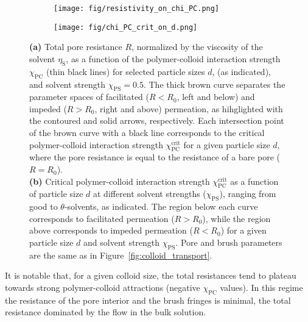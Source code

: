 \documentclass[12pt, a4paper]{article}
\begin{document}
\begin{figure}
    \centering
    \begin{subfigure}[b]{0.4\textwidth}
        \texttt{[image: fig/resistivity\_on\_chi\_PC.png]}
    \end{subfigure}
    \hspace{0.03\textwidth}
    \begin{subfigure}[b]{0.52\textwidth}
        \texttt{[image: fig/chi\_PC\_crit\_on\_d.png]}
    \end{subfigure}%
    \caption{
        \textbf{(a)} Total pore resistance $R$, normalized by the viscosity of the solvent $\eta_\text{S}$, as a function of the polymer-colloid interaction strength $\chi_{\text{PC}}$ (thin black lines) for selected particle sizes $d $, (as indicated), and solvent strength $\chi_{\text{PS}}=0.5$.
        The thick brown curve separates the parameter spaces of facilitated ($R < R_{0}$, left and below) and impeded ($R > R_{0}$, right and above) permeation, as hihglighted with the contoured and solid arrows, respectively.
        Each intersection point of the brown curve with a black line corresponds to the critical polymer-colloid interaction strength $\chi_{\text{PC}}^{\text{crit}}$ for a given particle size $d$, where the pore resistance is equal to the resistance of a bare pore ($R = R_{0}$).
        \\
        \textbf{(b)} Critical polymer-colloid interaction strength $\chi_{\text{PC}}^{\text{crit}}$ as a function of particle size $d$ at different solvent strengths ($\chi_{\text{PS}}$), ranging from good to $\theta$-solvents, as indicated.
        The region below each curve corresponds to facilitated permeation ($R > R_{0}$), while the region above corresponds to impeded permeation ($R < R_{0}$) for a given particle size $d$ and solvent strength $\chi_{\text{PS}}$.
        Pore and brush parameters are the same as in Figure~\ref{fig:colloid_transport}.
    }
    \label{fig:R_vs_chi_PC}
\end{figure}

It is notable that, for a given colloid size, the total resistances tend to plateau towards strong polymer-colloid attractions (negative $\chi_{\text{PC}}$ values).
In this regime the resistance of the pore interior and the brush fringes is minimal, the total resistance dominated by the flow in the bulk solution.

\end{document}
